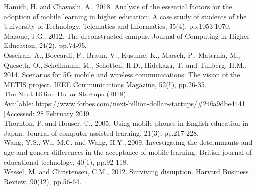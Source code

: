 \documentclass[11]{article}
\begin{document}
Hamidi, H. and Chavoshi, A., 2018. Analysis of the essential factors for the adoption of mobile learning in higher education: A case study of students of the University of Technology. Telematics and Informatics, 35(4), pp.1053-1070.\\

Mazoué, J.G., 2012. The deconstructed campus. Journal of Computing in Higher Education, 24(2), pp.74-95.\\

Osseiran, A., Boccardi, F., Braun, V., Kusume, K., Marsch, P., Maternia, M., Queseth, O., Schellmann, M., Schotten, H.D., Hidekazu, T. and Tullberg, H.M., 2014. Scenarios for 5G mobile and wireless communications: The vision of the METIS project. IEEE Communications Magazine, 52(5), pp.26-35.\\

The Next Billion-Dollar Startups (2018)\\
 Available: https://www.forbes.com/next-billion-dollar-startups/\#246a9dbe4441 [Accessed: 28 February 2019].\\

Thornton, P. and Houser, C., 2005. Using mobile phones in English education in Japan. Journal of computer assisted learning, 21(3), pp.217-228.\\

Wang, Y.S., Wu, M.C. and Wang, H.Y., 2009. Investigating the determinants and age and gender differences in the acceptance of mobile learning. British journal of educational technology, 40(1), pp.92-118.\\

Wessel, M. and Christensen, C.M., 2012. Surviving disruption. Harvard Business Review, 90(12), pp.56-64.\\
\end{document}
